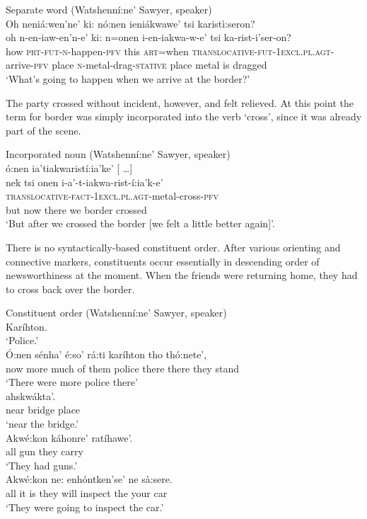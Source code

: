 \documentclass[output=paper,colorlinks,citecolor=brown]{langscibook}
\begin{document}
\ea Separate word (Watshenní:ne' Sawyer, speaker)\\
\glll  Oh   neniá:wen’ne’    ki: nó:nen  ieniákwawe’     tsi karistì:seron?\\
       oh   n-en-iaw-en’n-e’ ki: n=onen  i-en-iakwa-w-e’ tsi ka-rist-i’ser-on?\\
      how  \textsc{prt-fut-n}-happen-\textsc{pfv} this \textsc{art}=when \textsc{translocative-fut-1excl.pl.agt}-arrive-\textsc{pfv} place  \textsc{n}-metal-drag-\textsc{stative} place {metal is dragged}\\
\glt `What's going to happen when we arrive at the border?’
\z

The party crossed without incident, however, and felt relieved. At this point the term for border was simply incorporated into the verb `cross', since it was already part of the scene.

\ea Incorporated noun (Watshenní:ne' Sawyer, speaker)\\
  ó:nen                            {ia'tiakwaristí:ia'ke'  {[} \ldots {]}}\\
       {nek tsi}  onen                             i-a'-t-iakwa-rist-í:ia'k-e'\\ 
       {}         {}                               \textsc{translocative-fact-1excl.pl.agt}-metal-cross-\textsc{pfv}\\
       but        now                              {there we border crossed}\\
\glt  `But after we crossed the border {[}we felt a little better again{]}'.
\z

There is no syntactically-based constituent order. After various orienting and connective markers, constituents occur essentially in descending order of newsworthiness at the moment. When the friends were returning home, they had to cross back over the border.

\ea Constituent order (Watshenní:ne' Sawyer, speaker)\\
Karíhton.\\
\glt `Police.'\medskip\\
\gll Ó:nen sénha' é:so' rá:ti karíhton tho thó:nete',\\         
     now more much {of them} police there {there they stand}\\  
\glt `There were more police there'\medskip\\
     ahskwákta'.\\         
     {near bridge place}\\ 
\glt `near the bridge.'\medskip\\
\gll Akwé:kon káhonre' ratíhawe'.\\ 
     all gun {they carry}\\         
\glt `They had guns.'\medskip\\
\gll Akwé:kon ne: enhóntken'se' ne sà:sere.\\
     all {it is} {they will inspect} the {your car}\\
\glt `They were going to inspect the car.'
\z
\end{document}

